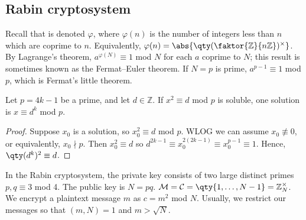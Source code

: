 \subsection{Rabin cryptosystem}
Recall that  is denoted $\varphi$, where $\varphi(n)$ is the number of integers less than $n$ which are coprime to $n$.
Equivalently, $\varphi(n) = \abs{\qty(\faktor{\mathbb Z}{n\mathbb Z})^\times}$.
By Lagrange's theorem, $a^{\varphi(N)} \equiv 1$ mod $N$ for each $a$ coprime to $N$; this result is sometimes known as the Fermat--Euler theorem.
If $N = p$ is prime, $a^{p-1} \equiv 1$ mod $p$, which is Fermat's little theorem.
\begin{lemma}
    Let $p = 4k - 1$ be a prime, and let $d \in \mathbb Z$.
    If $x^2 \equiv d$ mod $p$ is soluble, one solution is $x \equiv d^k$ mod $p$.
\end{lemma}
\begin{proof}
    Suppose $x_0$ is a solution, so $x_0^2 \equiv d$ mod $p$.
    WLOG we can assume $x_0 \not\equiv 0$, or equivalently, $x_0 \nmid p$.
    Then $x_0^2 \equiv d$ so $d^{2k-1} \equiv x_0^{2(2k-1)} \equiv x_0^{p-1} \equiv 1$.
    Hence, $\qty(d^k)^2 \equiv d$.
\end{proof}
In the Rabin cryptosystem, the private key consists of two large distinct primes $p, q \equiv 3$ mod 4.
The public key is $N = pq$.
$\mathcal M = \mathcal C = \qty{1, \dots, N-1} = \mathbb Z_N^\times$.
We encrypt a plaintext message $m$ as $c = m^2$ mod $N$.
Usually, we restrict our messages so that $(m, N) = 1$ and $m > \sqrt{N}$.

